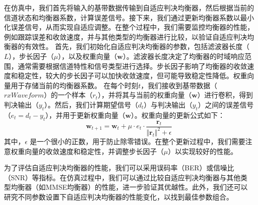 \documentclass[UTF8,a4paper,12pt]{ctexart}
\numberwithin{equation}{section}
\begin{document}
在仿真中，我们首先将输入的基带数据传输到自适应判决均衡器，然后根据当前的信道状态和均衡器系数，计算误差信号。接下来，我们通过更新均衡器系数以最小化误差信号，从而实现自适应调整。在整个过程中，我们需要监控均衡器的性能，例如跟踪误差和收敛速度，并与其他类型的均衡器进行比较，以验证自适应判决均衡器的有效性。
首先，我们初始化自适应判决均衡器的参数，包括滤波器长度（$L$），步长因子（$\mu$），以及权重向量（$\boldsymbol{w}$）。滤波器长度决定了均衡器的时域响应范围，通常需要根据信道特性和信号类型进行选择。步长因子影响了均衡器的收敛速度和稳定性，较大的步长因子可以加快收敛速度，但可能导致稳定性降低。权重向量用于存储当前的均衡器系数。
在每个时刻$t$，我们接收到基带数据（$\textit{rxWaveform}$）的一个样本（$r_t$），并将其与当前的权重向量（$\boldsymbol{w}$）进行卷积，得到判决输出（$y_t$）。然后，我们计算期望信号（$d_t$）与判决输出（$y_t$）之间的误差信号（$e_t = d_t - y_t$），并用于更新权重向量（$\boldsymbol{w}$）。权重向量的更新公式如下：
\begin{equation}
	\boldsymbol{w}_{t+1} = \boldsymbol{w}_t + \mu \cdot e_t \cdot \frac{\boldsymbol{r}_t}{\Vert \boldsymbol{r}_t \Vert^2 + \epsilon}
\end{equation}
其中，$\epsilon$ 是一个很小的正数，用于防止除零错误。在整个更新过程中，我们需要注意权重向量的收敛速度和稳定性，并调整步长因子（$\mu$）以实现较好的性能。

为了评估自适应判决均衡器的性能，我们可以采用误码率（BER）或信噪比（SNR）等指标。在仿真过程中，我们可以通过比较自适应判决均衡器与其他类型均衡器（如MMSE均衡器）的性能，进一步验证其优越性。此外，我们还可以研究不同参数设置下自适应判决均衡器的性能变化，以找到最佳参数组合。
\end{document}

